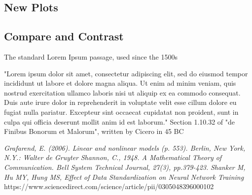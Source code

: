 \documentclass[11pt]{article}
\begin{document}
		\subsection*{New Plots}
			
		\subsection*{Compare and Contrast}
			The standard Lorem Ipsum passage, used since the 1500s
			
			"Lorem ipsum dolor sit amet, consectetur adipiscing elit, sed do eiusmod tempor incididunt ut labore et dolore magna aliqua. Ut enim ad minim veniam, quis nostrud exercitation ullamco laboris nisi ut aliquip ex ea commodo consequat. Duis aute irure dolor in reprehenderit in voluptate velit esse cillum dolore eu fugiat nulla pariatur. Excepteur sint occaecat cupidatat non proident, sunt in culpa qui officia deserunt mollit anim id est laborum."
			Section 1.10.32 of "de Finibus Bonorum et Malorum", written by Cicero in 45 BC
		
		 
		
	
	\pagebreak
	\begin{thebibliography}{1}	
		\textit{Grafarend, E. (2006). Linear and nonlinear models (p. 553). Berlin, New York, N.Y.: Walter de Gruyter}
		\textit{Shannon, C., 1948. A Mathematical Theory of Communication. Bell System Technical Journal, 27(3), pp.379-423.}
		\textit{Shanker M, Hu MY, Hung MS, Effect of Data Standardization on Neural Network Training} https://www.sciencedirect.com/science/article/pii/0305048396000102
		
		
		
	\end{thebibliography}
\end{document}
